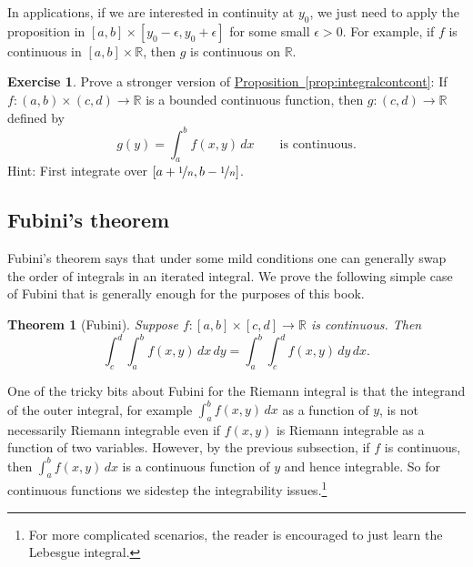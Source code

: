 \documentclass[12pt,openany]{book}
\newcommand{\R}{{\mathbb{R}}}
\theoremstyle{plain}
\newtheorem{thm}{Theorem}[section]
\theoremstyle{remark}
\theoremstyle{definition}
\newenvironment{exbox}{%
    \def\FrameCommand{\vrule width 1pt \relax\hspace{10pt}}%
    \MakeFramed{\advance\hsize-\width\FrameRestore}%
}{%
    \endMakeFramed
}
\theoremstyle{exercise}
\newtheorem{exercise}{Exercise}[section]
\theoremstyle{example}
\newcommand{\propref}[1]{\hyperref[#1]{Proposition~\ref*{#1}}}
\begin{document}
In applications, if we are interested in continuity at $y_0$, we just
need to apply the proposition in $[a,b] \times [y_0-\epsilon,y_0+\epsilon]$
for some small $\epsilon > 0$.  For example, if $f$ is continuous in
$[a,b] \times \R$, then $g$ is continuous on $\R$.

\begin{exbox}
\begin{exercise} \label{exercise:integralcontcontextra}
Prove a stronger version of \propref{prop:integralcontcont}:
If $f \colon (a,b) \times (c,d) \to \R$ is a bounded continuous function,
then $g \colon (c,d) \to \R$ defined by
\begin{equation*}
g(y) = \int_a^b f(x,y) \,dx  \qquad \text{is continuous}.
\end{equation*}
Hint: First integrate over $[a+\nicefrac{1}{n},b-\nicefrac{1}{n}]$.
\end{exercise}
\end{exbox}

\subsection{Fubini's theorem}

Fubini's theorem says that under some mild conditions one can generally
swap the order of integrals in an iterated integral.
We prove the following simple case of Fubini that is generally
enough for the purposes of this book.

\begin{thm}[Fubini]\label{thm:fubini}
Suppose $f \colon [a,b] \times [c,d] \to \R$ is continuous.  Then
\begin{equation*}
\int_c^d \int_a^b f(x,y) \, dx \, dy =
\int_a^b \int_c^d f(x,y) \, dy \, dx .
\end{equation*}
\end{thm}

One of the tricky bits about Fubini for the Riemann integral
is that the integrand of the outer integral, for example
$\int_a^b f(x,y) \, dx$ as a function of $y$, is not necessarily 
Riemann integrable even if $f(x,y)$ is Riemann integrable as a function of
two variables.  However, by the previous subsection, if $f$ is continuous,
then $\int_a^b f(x,y) \, dx$ is a continuous function of $y$ and hence
integrable.  So for continuous functions we sidestep the integrability
issues.\footnote{For more complicated scenarios, the reader is
encouraged to just learn the Lebesgue integral.}
\end{document}
